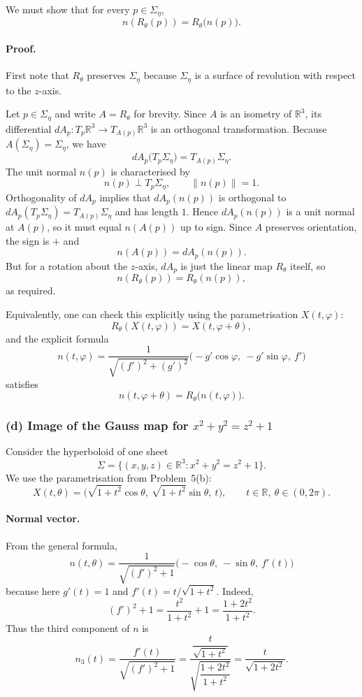 \documentclass[12pt,a4paper]{article}
\theoremstyle{plain}
\theoremstyle{definition}      %
\begin{document}
We must show that for every $p\in\Sigma_\eta$,
\[
n(R_\theta(p)) = R_\theta\bigl(n(p)\bigr).
\]

\paragraph{Proof.}
First note that $R_\theta$ preserves $\Sigma_\eta$ because $\Sigma_\eta$
is a surface of revolution with respect to the $z$-axis.

Let $p\in\Sigma_\eta$ and write $A=R_\theta$ for brevity.
Since $A$ is an isometry of $\mathbb{R}^3$, its differential
$dA_p:T_p\mathbb{R}^3\to T_{A(p)}\mathbb{R}^3$ is an orthogonal
transformation. Because $A(\Sigma_\eta)=\Sigma_\eta$, we have
\[
dA_p\bigl(T_p\Sigma_\eta\bigr)
= T_{A(p)}\Sigma_\eta.
\]
The unit normal $n(p)$ is characterised by
\[
n(p)\perp T_p\Sigma_\eta,\qquad \|n(p)\|=1.
\]
Orthogonality of $dA_p$ implies that $dA_p(n(p))$ is orthogonal to
$dA_p(T_p\Sigma_\eta)=T_{A(p)}\Sigma_\eta$ and has length $1$. Hence
$dA_p(n(p))$ is a unit normal at $A(p)$, so it must equal $n(A(p))$ up to
sign. Since $A$ preserves orientation, the sign is $+$ and
\[
n(A(p)) = dA_p(n(p)).
\]
But for a rotation about the $z$-axis, $dA_p$ is just the linear map
$R_\theta$ itself, so
\[
n(R_\theta(p)) = R_\theta(n(p)),
\]
as required.

Equivalently, one can check this explicitly using the parametrisation
$X(t,\varphi)$:
\[
R_\theta(X(t,\varphi)) = X(t,\varphi+\theta),
\]
and the explicit formula
\[
n(t,\varphi)
= \frac{1}{\sqrt{(f')^2+(g')^2}}
\bigl(-g'\cos\varphi,\ -g'\sin\varphi,\ f'\bigr)
\]
satisfies
\[
n(t,\varphi+\theta)
= R_\theta\bigl(n(t,\varphi)\bigr).
\]

\subsubsection*{(d) Image of the Gauss map for $x^2+y^2=z^2+1$}

Consider the hyperboloid of one sheet
\[
\Sigma = \{(x,y,z)\in\mathbb{R}^3 : x^2+y^2=z^2+1\}.
\]
We use the parametrisation from Problem~5(b):
\[
X(t,\theta)
= \bigl(\sqrt{1+t^2}\cos\theta,\ \sqrt{1+t^2}\sin\theta,\ t\bigr),
\qquad t\in\mathbb{R},\ \theta\in(0,2\pi).
\]

\paragraph{Normal vector.}
From the general formula,
\[
n(t,\theta)
= \frac{1}{\sqrt{(f')^2+1}}
\bigl(-\cos\theta,\ -\sin\theta,\ f'(t)\bigr)
\]
because here $g'(t)=1$ and $f'(t)=t/\sqrt{1+t^2}$.
Indeed,
\[
(f')^2+1
= \frac{t^2}{1+t^2}+1
= \frac{1+2t^2}{1+t^2}.
\]
Thus the third component of $n$ is
\[
n_3(t) =
\frac{f'(t)}{\sqrt{(f')^2+1}}
= \frac{\dfrac{t}{\sqrt{1+t^2}}}{
	\sqrt{\dfrac{1+2t^2}{1+t^2}}}
= \frac{t}{\sqrt{1+2t^2}}.
\]
\end{document}
